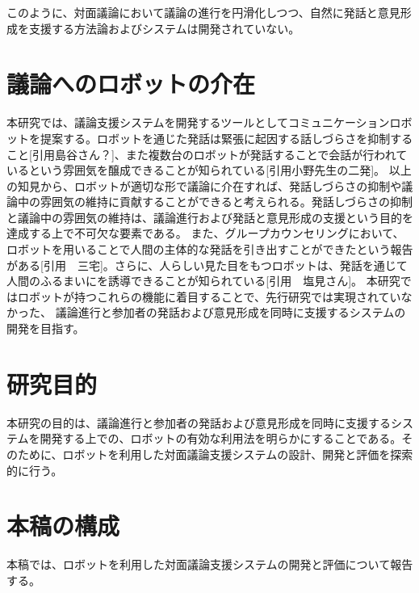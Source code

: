 \documentclass[11pt, a4paper]{jreport} %
\begin{document}
このように、対面議論において議論の進行を円滑化しつつ、自然に発話と意見形成を支援する方法論およびシステムは開発されていない。

\section{議論へのロボットの介在}
本研究では、議論支援システムを開発するツールとしてコミュニケーションロボットを提案する。ロボットを通じた発話は緊張に起因する話しづらさを抑制すること[引用島谷さん？]、また複数台のロボットが発話することで会話が行われているという雰囲気を醸成できることが知られている[引用小野先生の二発]。
以上の知見から、ロボットが適切な形で議論に介在すれば、発話しづらさの抑制や議論中の雰囲気の維持に貢献することができると考えられる。発話しづらさの抑制と議論中の雰囲気の維持は、議論進行および発話と意見形成の支援という目的を達成する上で不可欠な要素である。	また、グループカウンセリングにおいて、ロボットを用いることで人間の主体的な発話を引き出すことができたという報告がある[引用　三宅]。さらに、人らしい見た目をもつロボットは、発話を通じて人間のふるまいにを誘導できることが知られている[引用　塩見さん]。
本研究ではロボットが持つこれらの機能に着目することで、先行研究では実現されていなかった、
議論進行と参加者の発話および意見形成を同時に支援するシステムの開発を目指す。


\section{研究目的}
本研究の目的は、議論進行と参加者の発話および意見形成を同時に支援するシステムを開発する上での、ロボットの有効な利用法を明らかにすることである。そのために、ロボットを利用した対面議論支援システムの設計、開発と評価を探索的に行う。


\section{本稿の構成}
本稿では、ロボットを利用した対面議論支援システムの開発と評価について報告する。%
\end{document}

